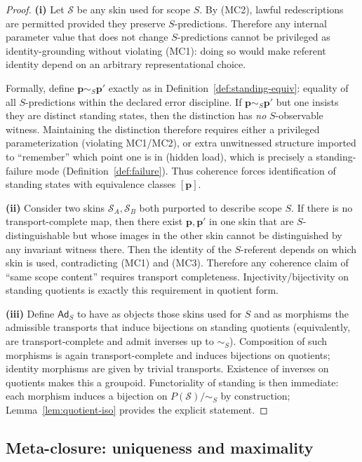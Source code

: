 \documentclass[11pt]{article}
\theoremstyle{remark}
\newcommand{\Skin}{\mathcal{S}}
\newcommand{\Ad}{\ensuremath{\mathsf{Ad}}}
\begin{document}
\begin{proof}
\textbf{(i)} Let $\Skin$ be any skin used for scope $S$. By (MC2), lawful redescriptions are permitted provided they
preserve $S$-predictions. Therefore any internal parameter value that does not change $S$-predictions cannot be
privileged as identity-grounding without violating (MC1): doing so would make referent identity depend on an
arbitrary representational choice.

Formally, define $\mathbf{p}\sim_S\mathbf{p}'$ exactly as in Definition~\ref{def:standing-equiv}: equality of all
$S$-predictions within the declared error discipline. If $\mathbf{p}\sim_S\mathbf{p}'$ but one insists they are
distinct standing states, then the distinction has \emph{no} $S$-observable witness.
Maintaining the distinction therefore requires either a privileged parameterization (violating MC1/MC2), or
extra unwitnessed structure imported to ``remember'' which point one is in (hidden load), which is precisely a
standing-failure mode (Definition~\ref{def:failure}).
Thus coherence forces identification of standing states with equivalence classes $[\mathbf{p}]$.

\textbf{(ii)} Consider two skins $\Skin_A,\Skin_B$ both purported to describe scope $S$.
If there is no transport-complete map, then there exist $\mathbf{p},\mathbf{p}'$ in one skin that are
$S$-distinguishable but whose images in the other skin cannot be distinguished by any invariant witness there.
Then the identity of the $S$-referent depends on which skin is used, contradicting (MC1) and (MC3).
Therefore any coherence claim of ``same scope content'' requires transport completeness.
Injectivity/bijectivity on standing quotients is exactly this requirement in quotient form.

\textbf{(iii)} Define $\Ad_S$ to have as objects those skins used for $S$ and as morphisms the admissible transports
that induce bijections on standing quotients (equivalently, are transport-complete and admit inverses up to
$\sim_S$). Composition of such morphisms is again transport-complete and induces bijections on quotients; identity
morphisms are given by trivial transports. Existence of inverses on quotients makes this a groupoid.
Functoriality of standing is then immediate: each morphism induces a bijection on $P(\Skin)/\!\sim_S$ by
construction; Lemma~\ref{lem:quotient-iso} provides the explicit statement.
\end{proof}



\subsection{Meta-closure: uniqueness and maximality}\label{sec:meta-closure}
\end{document}
